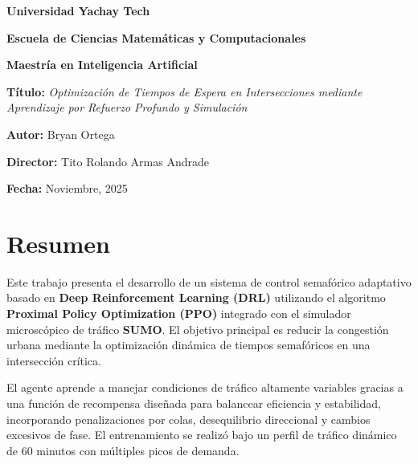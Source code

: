 \documentclass[12pt, a4paper]{report}
\begin{document}
\begin{titlepage}
    \centering
    {\Large \textbf{Universidad Yachay Tech} \par}
    \vspace{0.5cm}
    {\large \textbf{Escuela de Ciencias Matemáticas y Computacionales} \par}
    \vspace{0.5cm}
    {\large \textbf{Maestría en Inteligencia Artificial} \par}
    \vspace{2cm}
    
    {\Large \textbf{Título:} \textit{Optimización de Tiempos de Espera en Intersecciones mediante Aprendizaje por Refuerzo Profundo y Simulación} \par}
    \vspace{3cm}
    
    {\large \textbf{Autor:} Bryan Ortega \par}
    \vspace{0.5cm}
    {\large \textbf{Director:} Tito Rolando Armas Andrade \par}
    \vspace{2cm}
    
    {\large \textbf{Fecha:} Noviembre, 2025 \par}
    
    \vfill
\end{titlepage}

\chapter*{Resumen}

Este trabajo presenta el desarrollo de un sistema de control semafórico adaptativo basado en \textbf{Deep Reinforcement Learning (DRL)} utilizando el algoritmo \textbf{Proximal Policy Optimization (PPO)} integrado con el simulador microscópico de tráfico \textbf{SUMO}. El objetivo principal es reducir la congestión urbana mediante la optimización dinámica de tiempos semafóricos en una intersección crítica.

El agente aprende a manejar condiciones de tráfico altamente variables gracias a una función de recompensa diseñada para balancear eficiencia y estabilidad, incorporando penalizaciones por colas, desequilibrio direccional y cambios excesivos de fase. El entrenamiento se realizó bajo un perfil de tráfico dinámico de 60 minutos con múltiples picos de demanda.
\end{document}
